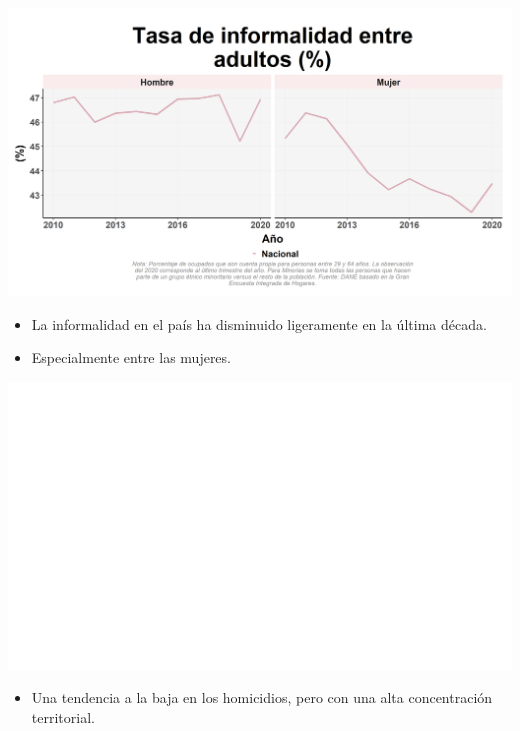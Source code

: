 \documentclass[aspectratio=169]{beamer}
\begin{document}
        \begin{slide}{15} 
            \begin{imagecolumn}
                \includegraphics[width=\columnwidth]{img/var_72_trend.png}
            \end{imagecolumn}
            \begin{textcolumn}
                \begin{itemize}
                    \item La informalidad en el país ha disminuido ligeramente en la última década. 
                    \item Especialmente entre las mujeres.
                \end{itemize}
            \end{textcolumn}
    \printcolumns
    \end{slide}    

        \begin{slide}{15} 
            \begin{imagecolumn}
                \includegraphics[width=\columnwidth]{img/var_286_map.png}
            \end{imagecolumn}
            \begin{textcolumn}
                \begin{itemize}
                    \item Una tendencia a la baja en los homicidios, pero con una alta concentración territorial.
                \end{itemize}
            \end{textcolumn}
    \printcolumns
    \end{slide}
    
\end{document}

